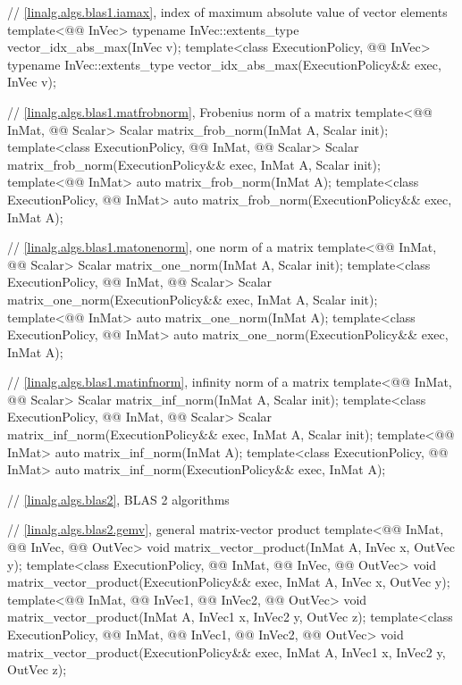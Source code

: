 \begin{codeblock}
{  // \ref{linalg.algs.blas1.iamax}, index of maximum absolute value of vector elements
  template<@@ InVec>
    typename InVec::extents_type vector_idx_abs_max(InVec v);
  template<class ExecutionPolicy, @@ InVec>
    typename InVec::extents_type vector_idx_abs_max(ExecutionPolicy&& exec, InVec v);

  // \ref{linalg.algs.blas1.matfrobnorm}, Frobenius norm of a matrix
  template<@@ InMat, @@ Scalar>
    Scalar matrix_frob_norm(InMat A, Scalar init);
  template<class ExecutionPolicy, @@ InMat, @@ Scalar>
    Scalar matrix_frob_norm(ExecutionPolicy&& exec, InMat A, Scalar init);
  template<@@ InMat>
    auto matrix_frob_norm(InMat A);
  template<class ExecutionPolicy, @@ InMat>
    auto matrix_frob_norm(ExecutionPolicy&& exec, InMat A);

  // \ref{linalg.algs.blas1.matonenorm}, one norm of a matrix
  template<@@ InMat, @@ Scalar>
    Scalar matrix_one_norm(InMat A, Scalar init);
  template<class ExecutionPolicy, @@ InMat, @@ Scalar>
    Scalar matrix_one_norm(ExecutionPolicy&& exec, InMat A, Scalar init);
  template<@@ InMat>
    auto matrix_one_norm(InMat A);
  template<class ExecutionPolicy, @@ InMat>
    auto matrix_one_norm(ExecutionPolicy&& exec, InMat A);

  // \ref{linalg.algs.blas1.matinfnorm}, infinity norm of a matrix
  template<@@ InMat, @@ Scalar>
    Scalar matrix_inf_norm(InMat A, Scalar init);
  template<class ExecutionPolicy, @@ InMat, @@ Scalar>
    Scalar matrix_inf_norm(ExecutionPolicy&& exec, InMat A, Scalar init);
  template<@@ InMat>
    auto matrix_inf_norm(InMat A);
  template<class ExecutionPolicy, @@ InMat>
    auto matrix_inf_norm(ExecutionPolicy&& exec, InMat A);

  // \ref{linalg.algs.blas2}, BLAS 2 algorithms

  // \ref{linalg.algs.blas2.gemv}, general matrix-vector product
  template<@@ InMat, @@ InVec, @@ OutVec>
    void matrix_vector_product(InMat A, InVec x, OutVec y);
  template<class ExecutionPolicy, @@ InMat, @@ InVec, @@ OutVec>
    void matrix_vector_product(ExecutionPolicy&& exec, InMat A, InVec x, OutVec y);
  template<@@ InMat, @@ InVec1, @@ InVec2, @@ OutVec>
    void matrix_vector_product(InMat A, InVec1 x, InVec2 y, OutVec z);
  template<class ExecutionPolicy,
           @@ InMat, @@ InVec1, @@ InVec2, @@ OutVec>
    void matrix_vector_product(ExecutionPolicy&& exec, InMat A, InVec1 x, InVec2 y, OutVec z);

}
\end{codeblock}
